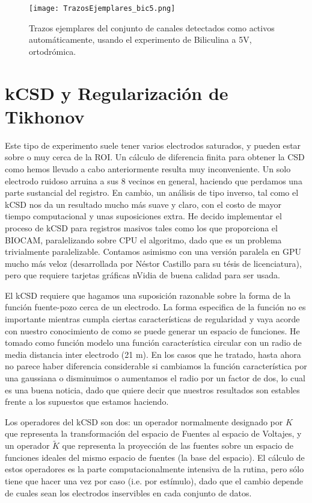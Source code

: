 \documentclass{article}
\begin{document}
\begin{figure}[h]
  \centering
  \texttt{[image: TrazosEjemplares\_bic5.png]}
  \caption{Trazos ejemplares del conjunto de canales detectados como
    activos automáticamente, usando el experimento de Biliculina a 5V, ortodrómica.}
  \label{trazosejemplo1}
\end{figure}



\section{kCSD y Regularización de Tikhonov}

Este tipo de experimento suele tener varios electrodos saturados, y pueden
estar sobre o muy cerca de la ROI. Un cálculo de diferencia finita para
obtener la CSD como hemos llevado a cabo anteriormente resulta muy inconveniente. Un solo electrodo ruidoso arruina a sus 8 vecinos en general, haciendo
que perdamos una parte sustancial del registro. En cambio, un análisis
de tipo inverso, tal como el kCSD \cite{Potworowski2011} nos da un resultado
mucho más suave y claro, con el costo de mayor tiempo computacional y unas
suposiciones extra. He decido implementar el proceso de kCSD para
registros masivos tales como los que proporciona el BIOCAM, paralelizando
sobre CPU el algoritmo, dado que es un problema trivialmente paralelizable.
Contamos asimismo con una versión paralela en GPU mucho más veloz
(desarrollada por Néstor Castillo para su tésis de licenciatura), pero
que requiere tarjetas gráficas nVidia de buena calidad para ser usada.

El kCSD requiere que hagamos una suposición razonable sobre
la forma de la función fuente-pozo cerca de un electrodo. La forma especifica
de la función no es importante mientras cumpla ciertas características
de regularidad y vaya acorde con nuestro conocimiento de como se puede
generar un espacio de funciones. He tomado como función modelo
una función característica circular con un radio de
media distancia inter electrodo (21 \textmu m). En los casos que he tratado,
hasta ahora no parece haber diferencia considerable si cambiamos la
función característica por una gaussiana o disminuimos o aumentamos el radio
por un factor de dos, lo cual es una buena noticia, dado que quiere decir
que nuestros resultados son estables frente a los supuestos que estamos haciendo.

Los operadores del kCSD son dos: un operador normalmente designado por $K$ que representa
la transformación del espacio de Fuentes al espacio de Voltajes, y un operador
$\tilde{K}$ que representa la proyección de las fuentes sobre un espacio de funciones ideales del mismo espacio de fuentes (la base del espacio). El cálculo de estos operadores
es la parte computacionalmente intensiva de la rutina, pero sólo tiene que hacer una vez
por caso (i.e. por estímulo), dado que el cambio depende de cuales sean los electrodos
inservibles en cada conjunto de datos.
\end{document}
